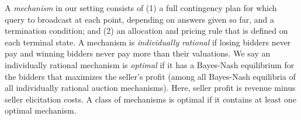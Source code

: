 




\begin{definition}
  A {\em mechanism} in our setting consists of (1) a full contingency plan
  for which query to broadcast at each point, depending on answers given so
  far, and a termination condition; and (2) an allocation and pricing rule
  that is defined on each terminal state.  A mechanism is {\em individually
    rational} if losing bidders never pay and winning bidders never pay
  more than their valuations.  We say an individually rational mechanism is
  {\em optimal} if it has a Bayes-Nash equilibrium for the bidders that maximizes the
  seller's profit (among all Bayes-Nash equilibria of all individually
  rational auction mechanisms).  Here, seller profit is revenue minus
  seller elicitation costs.
  A class of mechanisms is optimal if it contains at least one optimal
  mechanism.
\end{definition}
